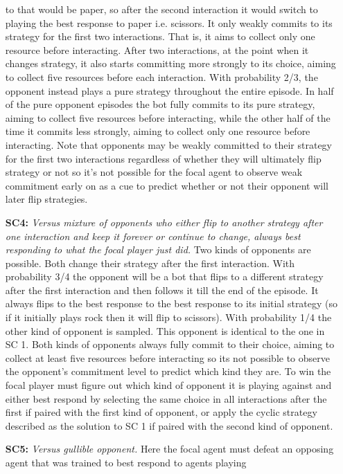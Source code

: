 \documentclass{article} %
\begin{document}
\begin{enumerate}
to that would be paper, so after the
second interaction it would switch to playing
the best response to paper i.e. scissors.
It only weakly commits to its strategy for
the first two interactions. That is, it aims to
collect only one resource before interacting.
After two interactions, at the point when
it changes strategy, it also starts committing
more strongly to its choice, aiming to
collect five resources before each interaction.
With probability 2/3, the opponent
instead plays a pure strategy throughout
the entire episode. In half of the pure opponent episodes the bot fully commits to
its pure strategy, aiming to collect five resources
before interacting, while the other
half of the time it commits less strongly,
aiming to collect only one resource before
interacting. Note that opponents may be
weakly committed to their strategy for the
first two interactions regardless of whether
they will ultimately flip strategy or not so
it’s not possible for the focal agent to observe
weak commitment early on as a cue
to predict whether or not their opponent
will later flip strategies.
    \item[\textbf{SC4:}] \textit{Versus mixture of opponents who either flip
to another strategy after one interaction and
keep it forever or continue to change, always
best responding to what the focal player just
did.} Two kinds of opponents are possible.
Both change their strategy after the first
interaction. With probability 3/4 the opponent
will be a bot that flips to a different
strategy after the first interaction and then
follows it till the end of the episode. It always
flips to the best response to the best
response to its initial strategy (so if it initially
plays rock then it will flip to scissors).
With probability 1/4 the other kind of opponent
is sampled. This opponent is identical
to the one in SC 1. Both kinds of opponents
always fully commit to their choice, aiming
to collect at least five resources before
interacting so its not possible to observe
the opponent’s commitment level to predict
which kind they are. To win the focal player
must figure out which kind of opponent it is
playing against and either best respond by
selecting the same choice in all interactions
after the first if paired with the first kind
of opponent, or apply the cyclic strategy
described as the solution to SC 1 if paired
with the second kind of opponent.
    \item[\textbf{SC5:}] \textit{Versus gullible opponent.} Here the focal
agent must defeat an opposing agent that
was trained to best respond to agents playing

\end{enumerate}
\end{document}
